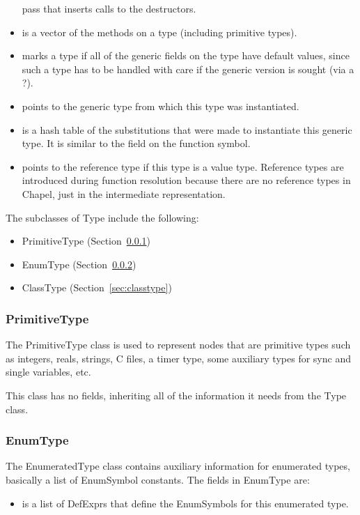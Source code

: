 \documentclass[10pt]{article}
\begin{document}
\begin{itemize}
  pass that inserts calls to the destructors.
\item {} is a vector of the methods on a
  type (including primitive types).
\item {} marks a type if all of the generic
  fields on the type have default values, since such a type has to be
  handled with care if the generic version is sought (via a ?).
\item {} points to the generic type from
  which this type was instantiated.
\item {} is a hash table of the
  substitutions that were made to instantiate this generic type.  It
  is similar to the field on the function symbol.
\item {} points to the reference type if this
  type is a value type.  Reference types are introduced during
  function resolution because there are no reference types in Chapel,
  just in the intermediate representation.
\end{itemize}

The subclasses of Type include the following:
\begin{itemize}
\item PrimitiveType (Section~\ref{sec:primitivetype})
\item EnumType (Section~\ref{sec:enumtype})
\item ClassType (Section~\ref{sec:classtype})
\end{itemize}

\subsubsection{PrimitiveType}
\label{sec:primitivetype}

The PrimitiveType class is used to represent nodes that are primitive
types such as integers, reals, strings, C files, a timer type, some
auxiliary types for sync and single variables, etc.

This class has no fields, inheriting all of the information it needs
from the Type class.

\subsubsection{EnumType}
\label{sec:enumtype}

The EnumeratedType class contains auxiliary information for enumerated
types, basically a list of EnumSymbol constants.  The fields in
EnumType are:
\begin{itemize}
\item {} is a list of DefExprs that define the
  EnumSymbols for this enumerated type.
\end{itemize}
\end{document}

